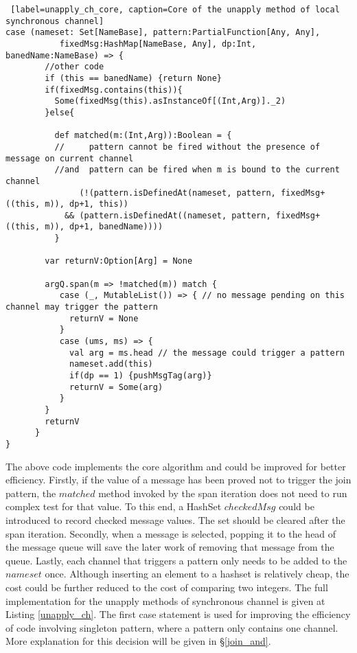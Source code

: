 \begin{lstlisting} [label=unapply_ch_core, caption=Core of the unapply method of local synchronous channel]
case (nameset: Set[NameBase], pattern:PartialFunction[Any, Any], 
           fixedMsg:HashMap[NameBase, Any], dp:Int, banedName:NameBase) => {
        //other code
        if (this == banedName) {return None}      
        if(fixedMsg.contains(this)){
          Some(fixedMsg(this).asInstanceOf[(Int,Arg)]._2)
        }else{
        
          def matched(m:(Int,Arg)):Boolean = {
          //     pattern cannot be fired without the presence of message on current channel  
          //and  pattern can be fired when m is bound to the current channel 
               (!(pattern.isDefinedAt(nameset, pattern, fixedMsg+((this, m)), dp+1, this))
            && (pattern.isDefinedAt((nameset, pattern, fixedMsg+((this, m)), dp+1, banedName))))
          }
                
        var returnV:Option[Arg] = None

        argQ.span(m => !matched(m)) match {
           case (_, MutableList()) => { // no message pending on this channel may trigger the pattern
             returnV = None
           }
           case (ums, ms) => {
             val arg = ms.head // the message could trigger a pattern
             nameset.add(this)
             if(dp == 1) {pushMsgTag(arg)}
             returnV = Some(arg)
           }
        }
        returnV
      }
}
\end{lstlisting}

The above code implements the core algorithm and could be improved for better efficiency.  Firstly, if the value of a message has been proved not to trigger the join pattern, the $matched$ method invoked by the span iteration does not need to run complex test for that value.  To this end, a HashSet $checkedMsg$ could be introduced to record checked message values.  The set should be cleared after the span iteration.  Secondly, when a message is selected, popping it to the head of the message queue will save the later work of removing that message from the queue.  Lastly, each channel that triggers a pattern only needs to be added to the $nameset$ once.  Although inserting an element to a hashset is relatively cheap, the cost could be further reduced to the cost of comparing two integers.  The full implementation for the unapply methods of synchronous channel is given at Listing \ref{unapply_ch}.  The first case statement is used for improving the efficiency of code involving singleton pattern, where a pattern only contains one channel.  More explanation for this decision will be given in \S\ref{join_and}.
 
